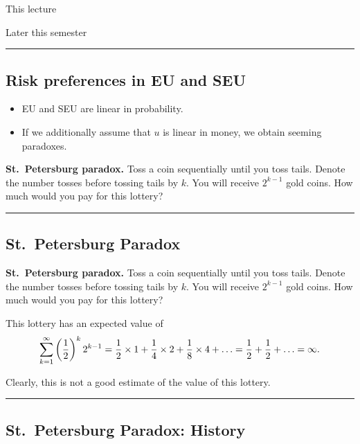 \documentclass[
  letterpaper,
  DIV=11,
  numbers=noendperiod]{scrartcl}
\providecommand{\tightlist}{%
  \setlength{\itemsep}{0pt}\setlength{\parskip}{0pt}}\usepackage{longtable,booktabs,array}
\begin{document}
{This lecture}

{Later this semester}

\begin{center}\rule{0.5\linewidth}{0.5pt}\end{center}

\subsection{Risk preferences in EU and
SEU}\label{risk-preferences-in-eu-and-seu}

\begin{itemize}
\tightlist
\item
  EU and SEU are linear in probability.
\item
  If we additionally assume that \(u\) is linear in money, we obtain
  seeming paradoxes.
\end{itemize}

\textbf{St.~Petersburg paradox.} Toss a coin sequentially until you toss
tails. Denote the number tosses before tossing tails by \(k\). You will
receive \(2^{k-1}\) gold coins. How much would you pay for this lottery?

\begin{center}\rule{0.5\linewidth}{0.5pt}\end{center}

\subsection{St.~Petersburg Paradox}\label{st.-petersburg-paradox}

\textbf{St.~Petersburg paradox.} Toss a coin sequentially until you toss
tails. Denote the number tosses before tossing tails by \(k\). You will
receive \(2^{k-1}\) gold coins. How much would you pay for this lottery?

This lottery has an expected value of \[\small
    \sum_{k=1}^{\infty}\left(\frac{1}{2}\right)^k 2^{k-1} = \frac{1}{2}\times 1 + \frac{1}{4}\times 2 + \frac{1}{8}\times 4 + \ldots 
    = \frac{1}{2} + \frac{1}{2} + \ldots = \infty.
\]

Clearly, this is not a good estimate of the value of this lottery.

\begin{center}\rule{0.5\linewidth}{0.5pt}\end{center}

\subsection{St.~Petersburg Paradox:
History}\label{st.-petersburg-paradox-history}
\end{document}
